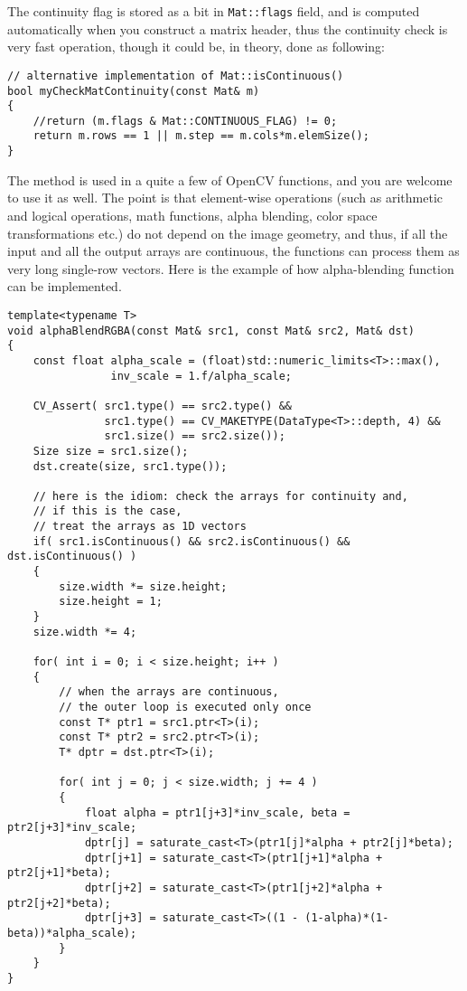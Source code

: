 The continuity flag is stored as a bit in \texttt{Mat::flags} field, and is computed automatically when you construct a matrix header, thus the continuity check is very fast operation, though it could be, in theory, done as following:

\begin{lstlisting}
// alternative implementation of Mat::isContinuous()
bool myCheckMatContinuity(const Mat& m)
{
    //return (m.flags & Mat::CONTINUOUS_FLAG) != 0;
    return m.rows == 1 || m.step == m.cols*m.elemSize();
}
\end{lstlisting}

The method is used in a quite a few of OpenCV functions, and you are welcome to use it as well. The point is that element-wise operations (such as arithmetic and logical operations, math functions, alpha blending, color space transformations etc.) do not depend on the image geometry, and thus, if all the input and all the output arrays are continuous, the functions can process them as very long single-row vectors. Here is the example of how alpha-blending function can be implemented.

\begin{lstlisting}
template<typename T>
void alphaBlendRGBA(const Mat& src1, const Mat& src2, Mat& dst)
{
    const float alpha_scale = (float)std::numeric_limits<T>::max(),
                inv_scale = 1.f/alpha_scale;
    
    CV_Assert( src1.type() == src2.type() &&
               src1.type() == CV_MAKETYPE(DataType<T>::depth, 4) &&
               src1.size() == src2.size());
    Size size = src1.size();
    dst.create(size, src1.type());
    
    // here is the idiom: check the arrays for continuity and,
    // if this is the case,
    // treat the arrays as 1D vectors
    if( src1.isContinuous() && src2.isContinuous() && dst.isContinuous() )
    {
        size.width *= size.height;
        size.height = 1;
    }
    size.width *= 4;
    
    for( int i = 0; i < size.height; i++ )
    {
        // when the arrays are continuous,
        // the outer loop is executed only once
        const T* ptr1 = src1.ptr<T>(i);
        const T* ptr2 = src2.ptr<T>(i);
        T* dptr = dst.ptr<T>(i);
        
        for( int j = 0; j < size.width; j += 4 )
        {
            float alpha = ptr1[j+3]*inv_scale, beta = ptr2[j+3]*inv_scale;
            dptr[j] = saturate_cast<T>(ptr1[j]*alpha + ptr2[j]*beta);
            dptr[j+1] = saturate_cast<T>(ptr1[j+1]*alpha + ptr2[j+1]*beta);
            dptr[j+2] = saturate_cast<T>(ptr1[j+2]*alpha + ptr2[j+2]*beta);
            dptr[j+3] = saturate_cast<T>((1 - (1-alpha)*(1-beta))*alpha_scale);
        }
    }
}
\end{lstlisting}

